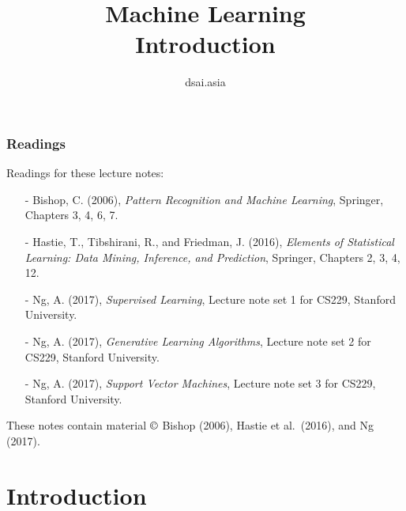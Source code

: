\documentclass{beamer}
\title[Machine Learning]{Machine Learning\\Introduction}
\author{dsai.asia}
\institute[]{Asian Data Science and Artificial Intelligence Master's Program}
\date{}
\begin{document}


\frame{\titlepage}

%

\begin{frame}
\frametitle{Readings}

Readings for these lecture notes:
\begin{itemize}
\item[-] Bishop, C. (2006), \textit{Pattern Recognition and Machine Learning},
  Springer, Chapters 3, 4, 6, 7.
\item[-] Hastie, T., Tibshirani, R., and Friedman, J. (2016),
  \textit{Elements of Statistical Learning: Data Mining, Inference, and
    Prediction}, Springer, Chapters 2, 3, 4, 12.
\item[-] Ng, A. (2017), \textit{Supervised Learning}, Lecture note set
  1 for CS229, Stanford University.
\item[-] Ng, A. (2017), \textit{Generative Learning Algorithms},
  Lecture note set 2 for CS229, Stanford University.
\item[-] Ng, A. (2017), \textit{Support Vector Machines},
  Lecture note set 3 for CS229, Stanford University.
\end{itemize}

These notes contain material $\copyright$ Bishop (2006), Hastie et
al.\ (2016), and Ng (2017).

\end{frame}

\section{Introduction}
\end{document}
